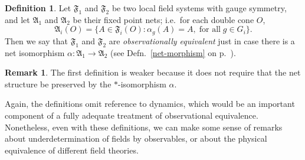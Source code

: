 \documentclass[12pt]{article}
\newcommand{\alg}[1]{\mathfrak{#1}}
\theoremstyle{definition}
\theoremstyle{definition}
\newtheorem{defn}[thm]{Definition}
\newtheorem{rema}[thm]{Remark}
\theoremstyle{remark}
\def\al#1{{\mathfrak #1}}
\def\a{\alpha} \def\b{\beta} \def\g{\gamma} \def\d{\delta}
\begin{document}
\begin{defn}
  Let $\al F_1$ and $\al F_2$ be two local field systems with gauge
  symmetry, and let $\al A_1$ and $\al A_2$ be their fixed point nets;
  i.e.\ for each double cone $O$,
$$ \al A_i(O) =\{ A\in \al F_i(O):\a _g(A)=A,\; \mbox{for all}\; g\in
G_i \} .$$ Then we say that $\alg{F}_1$ and $\alg{F}_2$ are
\emph{observationally equivalent} just in case there is a net
isomorphism $\a :\al A_1\to \al A_2$ (see Defn.\ \ref{net-morphism} on
p.\ \pageref{net-morphism}).
\end{defn}

\begin{rema} The first definition is weaker because it does not
  require that the net structure be preserved by the $*$-isomorphism
  $\a$.  \end{rema}

Again, the definitions omit reference to dynamics, which would be an
important component of a fully adequate treatment of observational
equivalence.  Nonetheless, even with these definitions, we can make
some sense of remarks about underdetermination of fields by
observables, or about the physical equivalence of different field
theories.
\end{document}
